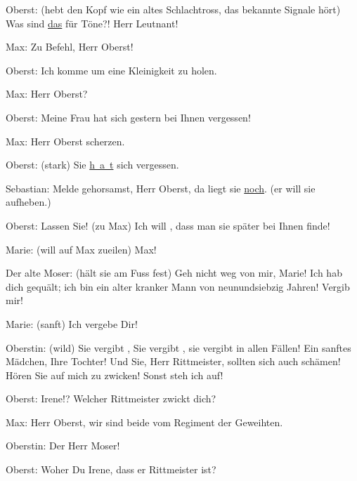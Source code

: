 \pstart
           Oberst: (hebt den Kopf wie ein altes Schlachtross, das bekannte Signale hört) Was
               sind \uline{das} für Töne?! Herr Leutnant!\pend
           
\pstart
           Max: Zu Befehl, Herr Oberst!\pend
           
\pstart
           Oberst: Ich komme um eine Kleinigkeit zu holen.\pend
           
\pstart
           Max: Herr Oberst?\pend
           
\pstart
           {\pb}Oberst: Meine Frau hat sich
               gestern bei Ihnen vergessen!\pend
           
\pstart
           Max: Herr Oberst scherzen.\pend
           
\pstart
           Oberst: (stark) Sie 
               \uline{h a t}
                sich vergessen.\pend
           
\pstart
           Sebastian: Melde gehorsamst, Herr Oberst, da liegt sie \uline{noch}. (er will sie aufheben.)\pend
           
\pstart
           Oberst: Lassen Sie! (zu Max) Ich will , dass man
               sie später bei Ihnen finde!\pend
           
\pstart
           Marie: (will auf Max zueilen) Max!\pend
           
\pstart
           Der alte Moser: (hält sie am Fuss fest) Geh nicht weg von mir, Marie! Ich hab dich
               gequält; ich bin ein alter kranker Mann von neunundsiebzig Jahren! Vergib mir!\pend
           
\pstart
           Marie: (sanft) Ich vergebe Dir!\pend
           
\pstart
           Oberstin: (wild) Sie vergibt , Sie vergibt , sie vergibt in allen Fällen! Ein sanftes Mädchen, Ihre
               Tochter! Und Sie, Herr Rittmeister, sollten sich auch schämen! Hören Sie auf mich zu
               zwicken! Sonst steh ich auf!\pend
           
\pstart
           Oberst: Irene!? Welcher Rittmeister zwickt dich?\pend
           
\pstart
           Max: Herr Oberst, wir sind beide vom Regiment der Geweihten.\pend
           
\pstart
           Oberstin: Der Herr Moser!\pend
           
\pstart
           Oberst: Woher \label{T_L01900-2v}\label{T_L01900-2h} Du Irene, dass er Rittmeister ist?\pend
           
